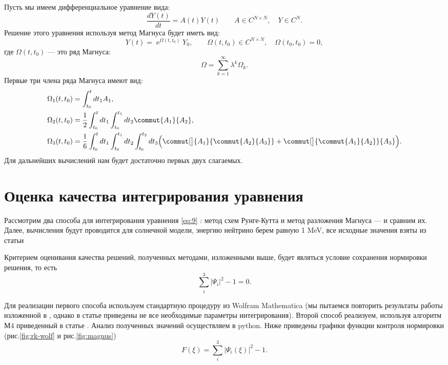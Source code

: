 \documentclass[a4paper,12pt]{article}
\renewcommand{\exp}{\operatorname{e}}
\begin{document}
Пусть мы имеем дифференциальное уравнение вида:
\begin{equation*}
	\frac{dY(t)}{dt}=A(t)Y(t)\qquad
	A\in C^{N\times N},\quad
	Y\in C^{N}.
\end{equation*}
Решение этого уравнения используя метод Магнуса будет иметь вид:
\begin{equation*}
	Y(t)=\exp^{\Omega(t,t_{0})}Y_{0},\qquad
	\Omega(t,t_{0})\in C^{N\times N},\quad
	\Omega(t_{0},t_{0})=0,
\end{equation*}
где \(\Omega(t,t_{0})\) — это ряд Магнуса:
\begin{equation*}
	\Omega=\sum_{k=1}^{\infty}\lambda^{k}\Omega_{k}.
\end{equation*}
Первые три члена ряда Магнуса имеют вид:
\begin{equation*}
  \begin{lgathered}
    \Omega_{1}(t,t_{0})=\int_{t_{0}}^{t} dt_{1}A_{1},\\
    \Omega_{2}(t,t_{0})=\frac{1}{2}\int_{t_{0}}^{t} dt_{1}
    \int_{t_{0}}^{t_{1}} dt_{2}\commut{A_{1}}{A_{2}},\\
    \Omega_{3}(t,t_{0})=\frac{1}{6}\int_{t_{0}}^{t} dt_{1} \int_{t_{0}}^{t_{1}}
    dt_{2} \int_{t_{0}}^{t_{2}} dt_{3}\Big(
    \commut[\big]{A_{1}}{\commut{A_{2}}{A_{3}}}+
    \commut[\big]{\commut{A_{1}}{A_{2}}}{A_{3}}\Big).
  \end{lgathered}
\end{equation*}
Для дальнейших вычислений нам будет достаточно первых двух слагаемых. 

\newpage
\section{Оценка качества интегрирования уравнения}

Рассмотрим два способа для интегрирования уравнения \eqref{eq:9} : метод схем Рунге-Кутта и метод разложения Магнуса --- и сравним их.
Далее, вычисления будут проводится для солнечной модели, энергию нейтрино берем равную 1 MeV, все исходные значения
взяты из статьи \cite{Casas:2016asi}

Критерием оценивания качества решений, полученных методами, изложенными выше, будет являться условие сохранения нормировки решения, то есть
\begin{equation}
  \label{eq:5}
  \sum_{i}^{3}|\Psi_{i}|^{2}-1=0.
\end{equation}

Для реализации первого способа используем стандартную процедуру из Wolfram Mathematica (мы пытаемся повторить результаты работы изложенной в \cite{Casas:2016asi}, однако в статье приведены не все необходимые параметры интегрирования).
Второй способ реализуем, используя алгоритм М4 приведенный в статье \cite{Casas:2016asi}. Анализ полученных значений осуществляем в python. Ниже приведены графики
функции контроля нормировки (рис.\ref{fig:rk-wolf} и рис.\ref{fig:magnus})
\begin{equation}
  \label{eq:6}
  F(\xi)=\sum_{i}^{3}|\Psi_{i}(\xi)|^{2}-1.
\end{equation}
\end{document}
